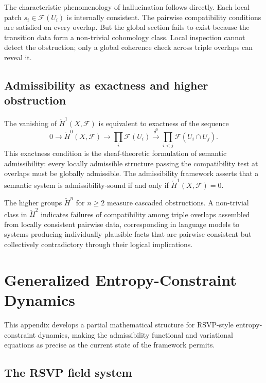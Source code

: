 \documentclass[12pt, a4paper]{article}
\theoremstyle{plain}
\theoremstyle{definition}
\theoremstyle{remark}
\begin{document}
The characteristic phenomenology of hallucination follows directly. Each local patch
$s_i \in \mathcal{F}(U_i)$ is internally consistent. The pairwise compatibility
conditions are satisfied on every overlap. But the global section fails to exist
because the transition data form a non-trivial cohomology class. Local inspection
cannot detect the obstruction; only a global coherence check across triple overlaps
can reveal it.

\subsection{Admissibility as exactness and higher obstruction}

The vanishing of $\check{H}^1(X, \mathcal{F})$ is equivalent to exactness of the
sequence
\[
  0 \to \check{H}^0(X,\mathcal{F}) \to \prod_i \mathcal{F}(U_i)
  \xrightarrow{\delta^0} \prod_{i < j} \mathcal{F}(U_i \cap U_j).
\]
This exactness condition is the sheaf-theoretic formulation of semantic admissibility:
every locally admissible structure passing the compatibility test at overlaps must be
globally admissible. The admissibility framework asserts that a semantic system is
admissibility-sound if and only if $\check{H}^1(X,\mathcal{F}) = 0$.

The higher groups $\check{H}^n$ for $n \geq 2$ measure cascaded obstructions.
A non-trivial class in $\check{H}^2$ indicates failures of compatibility among triple
overlaps assembled from locally consistent pairwise data, corresponding in language
models to systems producing individually plausible facts that are pairwise consistent
but collectively contradictory through their logical implications.

\section{Generalized Entropy-Constraint Dynamics}
\label{app:rsvp}

This appendix develops a partial mathematical structure for RSVP-style entropy-constraint
dynamics, making the admissibility functional and variational equations as precise as
the current state of the framework permits.

\subsection{The RSVP field system}
\end{document}
